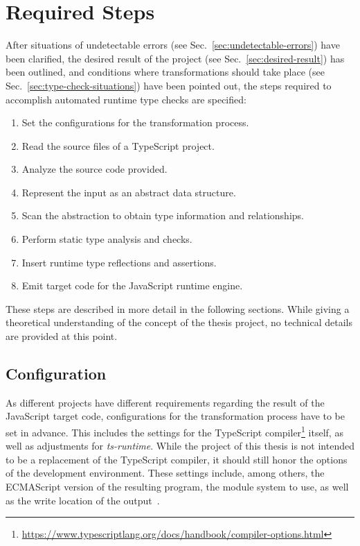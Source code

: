 \section{Required Steps}
\label{sec:required-steps}

After situations of undetectable errors (see Sec.~\ref{sec:undetectable-errors}) have been clarified, the desired result of the project (see Sec.~\ref{sec:desired-result}) has been outlined, and conditions where transformations should take place (see Sec.~\ref{sec:type-check-situations}) have been pointed out, the steps required to accomplish automated runtime type checks are specified:
\begin{enumerate}
  \item Set the configurations for the transformation process.
  \item Read the source files of a TypeScript project.
  \item Analyze the source code provided.
  \item Represent the input as an abstract data structure.
  \item Scan the abstraction to obtain type information and relationships.
  \item Perform static type analysis and checks.
  \item Insert runtime type reflections and assertions.
  \item Emit target code for the JavaScript runtime engine.
\end{enumerate}
These steps are described in more detail in the following sections. While giving a theoretical understanding of the concept of the thesis project, no technical details are provided at this point.

\subsection{Configuration}
\label{sec:steps-configuration}

As different projects have different requirements regarding the result of the JavaScript target code, configurations for the transformation process have to be set in advance. This includes the settings for the TypeScript compiler\footnote{\url{https://www.typescriptlang.org/docs/handbook/compiler-options.html}} itself, as well as adjustments for \emph{ts-runtime}. While the project of this thesis is not intended to be a replacement of the TypeScript compiler, it should still honor the options of the development environment. These settings include, among others, the ECMAScript version of the resulting program, the module system to use, as well as the write location of the output~\cite{TypeScriptHandbook:CompilerOptions}.

